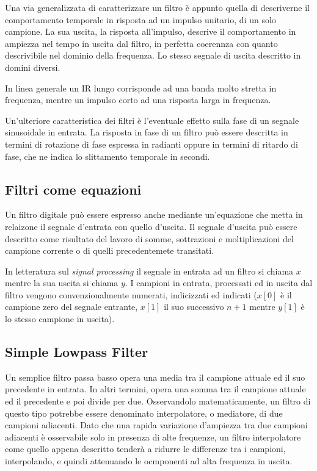 Una via generalizzata di caratterizzare un filtro è appunto quella di descriverne
il comportamento temporale in risposta ad un impulso unitario, di un solo campione.
La sua uscita, la risposta all'impulso, descrive il comportamento in ampiezza nel
tempo in uscita dal filtro, in perfetta coerennza con quanto descrivibile nel dominio
della frequenza. Lo stesso segnale di uscita descritto in domini diversi.

In linea generale un IR lungo corrisponde ad una banda molto stretta in frequenza,
mentre un impulso corto ad una risposta larga in frequenza.

Un'ulteriore caratteristica dei filtri è l'eventuale effetto sulla fase di un
segnale sinusoidale in entrata. La risposta in fase di un filtro può essere descritta
in termini di rotazione di fase espressa in radianti oppure in termini di ritardo
di fase, che ne indica lo slittamento temporale in secondi.

\subsection{Filtri come equazioni}

Un filtro digitale può essere espresso anche mediante un'equazione che metta in
relaizone il segnale d'entrata con quello d'uscita. Il segnale d'uscita può essere
descritto come risultato del lavoro di somme, sottrazioni e moltiplicazioni del
campione corrente o di quelli precedentemete transitati.

In letteratura sul \emph{signal processing} il segnale in entrata ad un filtro si
chiama $ x $ mentre la sua uscita si chiama $ y $. I campioni in entrata, processati
ed in uscita dal filtro vengono convenzionalmente numerati, indicizzati ed indicati
($ x[0] $ è il campione zero del segnale entrante, $ x[1] $ il suo successivo
$ n+1 $ mentre $ y[1] $ è lo stesso campione in uscita).

\subsection{Simple Lowpass Filter}

Un semplice filtro passa basso opera una media tra il campione attuale ed il suo
precedente in entrata. In altri termini, opera una somma tra il campione attuale
ed il precedente e poi divide per due. Osservandolo matematicamente, un filtro di
questo tipo potrebbe essere denominato interpolatore, o mediatore, di due
campioni adiacenti. Dato che una rapida variazione d'ampiezza tra due campioni
adiacenti è osservabile solo in presenza di alte frequenze, un filtro interpolatore
come quello appena descritto tenderà a ridurre le differenze tra i campioni, interpolando,
e quindi attenuando le ocmponenti ad alta frequenza in uscita.

